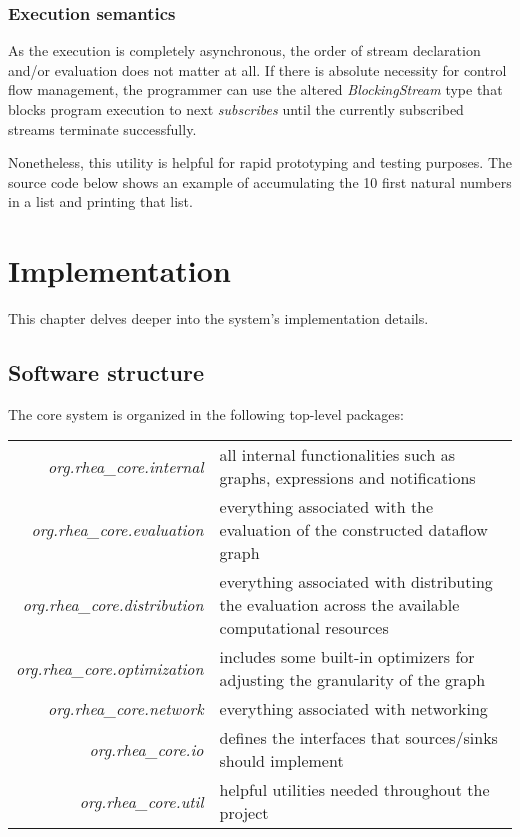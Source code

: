 \documentclass[sigplan,review,anonymous]{acmart}\settopmatter{printfolios=true}
\begin{document}

\subsubsection{Execution semantics}

As the execution is completely asynchronous, the order of stream declaration and/or evaluation does not matter at all. If there is absolute necessity for control flow management, the programmer can use the altered \textit{BlockingStream} type that blocks program execution to next \textit{subscribes} until the currently subscribed streams terminate successfully. 

Nonetheless, this utility is helpful for rapid prototyping and testing purposes. The source code below shows an example of accumulating the 10 first natural numbers in a list and printing that list. 


\section{Implementation}
This chapter delves deeper into the system's implementation details. 

\subsection{Software structure}

The core system is organized in the following top-level packages:

\begin{tabularx}{\columnwidth}{rX}
	\textit{org.rhea\_core.internal} 
	& all internal functionalities such as graphs, expressions and notifications \\
	\textit{org.rhea\_core.evaluation}
	& everything associated with the evaluation of the constructed dataflow graph \\
	\textit{org.rhea\_core.distribution}
	& everything associated with distributing the evaluation across the available computational resources \\
	\textit{org.rhea\_core.optimization}	
	& includes some built-in optimizers for adjusting the  granularity of the graph \\
	\textit{org.rhea\_core.network}	
	& everything associated with networking \\
	\textit{org.rhea\_core.io}
	& defines the interfaces that sources/sinks should implement \\
	\textit{org.rhea\_core.util}
	& helpful utilities needed throughout the project \\
\end{tabularx}
\end{document}
